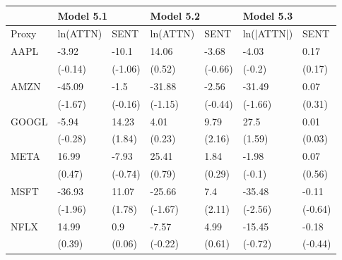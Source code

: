 \begin{tabular}{lllllll}
\toprule
{} & \multicolumn{2}{l}{Model 5.1} & \multicolumn{2}{l}{Model 5.2} & \multicolumn{2}{l}{Model 5.3} \\
\midrule
Proxy &  ln(ATTN) &     SENT &  ln(ATTN) &     SENT &  ln(|ATTN|) &     SENT \\
AAPL  &     -3.92 &    -10.1 &     14.06 &    -3.68 &       -4.03 &     0.17 \\
      &   (-0.14) &  (-1.06) &    (0.52) &  (-0.66) &      (-0.2) &   (0.17) \\
AMZN  &    -45.09 &     -1.5 &    -31.88 &    -2.56 &      -31.49 &     0.07 \\
      &   (-1.67) &  (-0.16) &   (-1.15) &  (-0.44) &     (-1.66) &   (0.31) \\
GOOGL &     -5.94 &    14.23 &      4.01 &     9.79 &        27.5 &     0.01 \\
      &   (-0.28) &   (1.84) &    (0.23) &   (2.16) &      (1.59) &   (0.03) \\
META  &     16.99 &    -7.93 &     25.41 &     1.84 &       -1.98 &     0.07 \\
      &    (0.47) &  (-0.74) &    (0.79) &   (0.29) &      (-0.1) &   (0.56) \\
MSFT  &    -36.93 &    11.07 &    -25.66 &      7.4 &      -35.48 &    -0.11 \\
      &   (-1.96) &   (1.78) &   (-1.67) &   (2.11) &     (-2.56) &  (-0.64) \\
NFLX  &     14.99 &      0.9 &     -7.57 &     4.99 &      -15.45 &    -0.18 \\
      &    (0.39) &   (0.06) &   (-0.22) &   (0.61) &     (-0.72) &  (-0.44) \\
\bottomrule
\end{tabular}
